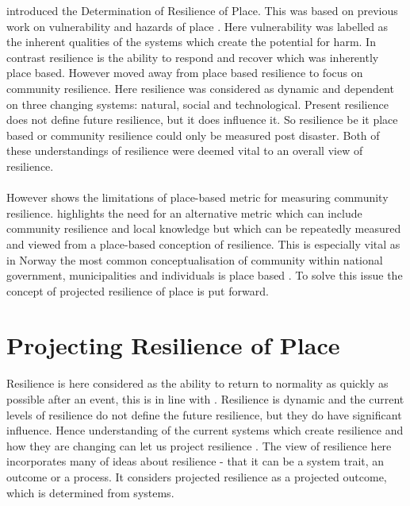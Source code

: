 \cite{cutter_place-based_2008} introduced the Determination of Resilience of Place. This was based on previous work on vulnerability and hazards of place \cite{cutter_vulnerability_1996}. Here vulnerability was labelled as the inherent qualities of the systems which create the potential for harm.
In contrast resilience is the ability to respond and recover which was inherently place based. However \cite{cutter_community_2020} moved away from place based resilience to focus on community resilience. Here resilience was considered as dynamic and dependent on three changing systems: natural, social and technological. Present resilience does not define future resilience, but it does influence it. So resilience be it place based or community resilience could only be measured post disaster. Both of these understandings of resilience were deemed vital to an overall view of resilience.
\paragraph{}

However \cite{rasanen_conceptualizing_2020} shows the limitations of place-based metric for measuring community resilience. \cite{rasanen_conceptualizing_2020} highlights the need for an alternative metric which can include community resilience and local knowledge but which can be repeatedly measured and viewed from a place-based conception of resilience. This is especially vital as in Norway the most common conceptualisation of community within national government, municipalities and individuals is place based \cite{rasanen_conceptualizing_2020}. To solve this issue the concept of projected resilience of place is put forward. 




\section{Projecting Resilience of Place} 
Resilience is here considered as the ability to return to normality as quickly as possible after an event, this is in line with \cite{cutter_place-based_2008}. Resilience is dynamic and the current levels of resilience do not define the future resilience, but they do have significant influence. Hence understanding of the current systems which create resilience and how they are changing can let us project resilience \cite{cutter_community_2020}. The view of resilience here incorporates many of \cite{moser_turbulent_2019} ideas about resilience -  that it can be a system trait, an outcome or a process. It considers projected resilience as a projected outcome, which is determined from systems. 

